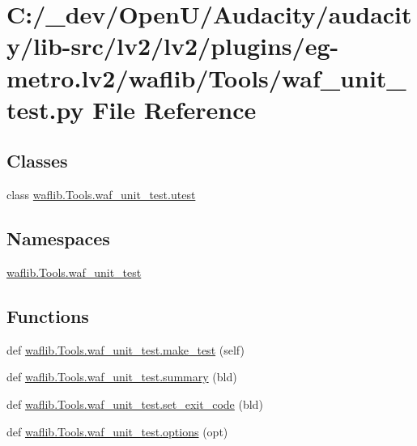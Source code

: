 \hypertarget{lv2_2plugins_2eg-metro_8lv2_2waflib_2_tools_2waf__unit__test_8py}{}\section{C\+:/\+\_\+dev/\+Open\+U/\+Audacity/audacity/lib-\/src/lv2/lv2/plugins/eg-\/metro.lv2/waflib/\+Tools/waf\+\_\+unit\+\_\+test.py File Reference}
\label{lv2_2plugins_2eg-metro_8lv2_2waflib_2_tools_2waf__unit__test_8py}
\subsection*{Classes}
\begin{DoxyCompactItemize}
\item 
class \hyperlink{classwaflib_1_1_tools_1_1waf__unit__test_1_1utest}{waflib.\+Tools.\+waf\+\_\+unit\+\_\+test.\+utest}
\end{DoxyCompactItemize}
\subsection*{Namespaces}
\begin{DoxyCompactItemize}
\item 
 \hyperlink{namespacewaflib_1_1_tools_1_1waf__unit__test}{waflib.\+Tools.\+waf\+\_\+unit\+\_\+test}
\end{DoxyCompactItemize}
\subsection*{Functions}
\begin{DoxyCompactItemize}
\item 
def \hyperlink{namespacewaflib_1_1_tools_1_1waf__unit__test_a480792e43cdb6d6a2bd79b2ec412cf00}{waflib.\+Tools.\+waf\+\_\+unit\+\_\+test.\+make\+\_\+test} (self)
\item 
def \hyperlink{namespacewaflib_1_1_tools_1_1waf__unit__test_ad245dac5d636a5c5f49cb0e232d332f4}{waflib.\+Tools.\+waf\+\_\+unit\+\_\+test.\+summary} (bld)
\item 
def \hyperlink{namespacewaflib_1_1_tools_1_1waf__unit__test_a0f1dc47e6fcefddfd017ce557eb4da42}{waflib.\+Tools.\+waf\+\_\+unit\+\_\+test.\+set\+\_\+exit\+\_\+code} (bld)
\item 
def \hyperlink{namespacewaflib_1_1_tools_1_1waf__unit__test_a8f30080b41250ee5ad33b2ad2df40f0c}{waflib.\+Tools.\+waf\+\_\+unit\+\_\+test.\+options} (opt)
\end{DoxyCompactItemize}
